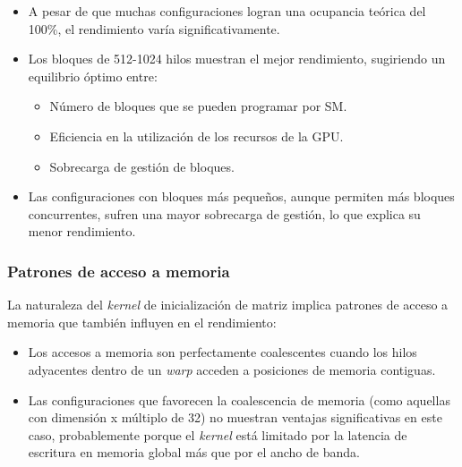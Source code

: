             \begin{itemize}
              
                \item A pesar de que muchas configuraciones logran una ocupancia teórica del 100\%, el rendimiento varía significativamente.
                
                \item Los bloques de 512-1024 hilos muestran el mejor rendimiento, sugiriendo un equilibrio óptimo entre:
                
                \begin{itemize}
                
                    \item Número de bloques que se pueden programar por SM.
                    
                    \item Eficiencia en la utilización de los recursos de la GPU.
                    
                    \item Sobrecarga de gestión de bloques.
                
                \end{itemize}
              
                \item Las configuraciones con bloques más pequeños, aunque permiten más bloques concurrentes, sufren una mayor sobrecarga de gestión, lo que explica su menor rendimiento.

            \end{itemize}
    
        \subsubsection{Patrones de acceso a memoria}
    
            La naturaleza del \textit{kernel} de inicialización de matriz implica patrones de acceso a memoria que también influyen en el rendimiento:
            
            \begin{itemize}
            
                \item Los accesos a memoria son perfectamente coalescentes cuando los hilos adyacentes dentro de un \textit{warp} acceden a posiciones de memoria contiguas.
                
                \item Las configuraciones que favorecen la coalescencia de memoria (como aquellas con dimensión x múltiplo de 32) no muestran ventajas significativas en este caso, probablemente porque el \textit{kernel} está limitado por la latencia de escritura en memoria global más que por el ancho de banda.
           
            \end{itemize}
    
